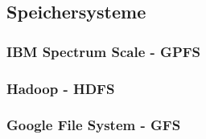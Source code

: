 \subsection{Speichersysteme}
\subsubsection{IBM Spectrum Scale - GPFS}
\subsubsection{Hadoop - HDFS}
\subsubsection{Google File System - GFS}